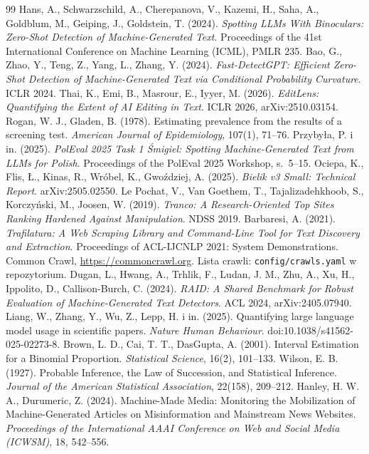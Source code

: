 \documentclass[11pt,a4paper]{article}
\begin{document}
\begin{thebibliography}{99}\small
{} Hans, A., Schwarzschild, A., Cherepanova, V., Kazemi, H., Saha, A., Goldblum, M., Geiping, J., Goldstein, T. (2024). \emph{Spotting LLMs With Binoculars: Zero-Shot Detection of Machine-Generated Text}. Proceedings of the 41st International Conference on Machine Learning (ICML), PMLR 235.
 Bao, G., Zhao, Y., Teng, Z., Yang, L., Zhang, Y. (2024). \emph{Fast-DetectGPT: Efficient Zero-Shot Detection of Machine-Generated Text via Conditional Probability Curvature}. ICLR 2024.
 Thai, K., Emi, B., Masrour, E., Iyyer, M. (2026). \emph{EditLens: Quantifying the Extent of AI Editing in Text}. ICLR 2026, arXiv:2510.03154.
 Rogan, W. J., Gladen, B. (1978). Estimating prevalence from the results of a screening test. \emph{American Journal of Epidemiology}, 107(1), 71--76.
 Przybyła, P. i in. (2025). \emph{PolEval 2025 Task 1 Śmigiel: Spotting Machine-Generated Text from LLMs for Polish}. Proceedings of the PolEval 2025 Workshop, s.~5--15.
 Ociepa, K., Flis, Ł., Kinas, R., Wróbel, K., Gwoździej, A. (2025). \emph{Bielik v3 Small: Technical Report}. arXiv:2505.02550.
 Le Pochat, V., Van Goethem, T., Tajalizadehkhoob, S., Korczyński, M., Joosen, W. (2019). \emph{Tranco: A Research-Oriented Top Sites Ranking Hardened Against Manipulation}. NDSS 2019.
 Barbaresi, A. (2021). \emph{Trafilatura: A Web Scraping Library and Command-Line Tool for Text Discovery and Extraction}. Proceedings of ACL-IJCNLP 2021: System Demonstrations.
 Common Crawl, \url{https://commoncrawl.org}. Lista crawli: \texttt{config/crawls.yaml} w repozytorium.
 Dugan, L., Hwang, A., Trhlik, F., Ludan, J. M., Zhu, A., Xu, H., Ippolito, D., Callison-Burch, C. (2024). \emph{RAID: A Shared Benchmark for Robust Evaluation of Machine-Generated Text Detectors}. ACL 2024, arXiv:2405.07940.
 Liang, W., Zhang, Y., Wu, Z., Lepp, H. i in. (2025). Quantifying large language model usage in scientific papers. \emph{Nature Human Behaviour}. doi:10.1038/s41562-025-02273-8.
 Brown, L. D., Cai, T. T., DasGupta, A. (2001). Interval Estimation for a Binomial Proportion. \emph{Statistical Science}, 16(2), 101--133.
 Wilson, E. B. (1927). Probable Inference, the Law of Succession, and Statistical Inference. \emph{Journal of the American Statistical Association}, 22(158), 209--212.
 Hanley, H. W. A., Durumeric, Z. (2024). Machine-Made Media: Monitoring the Mobilization of Machine-Generated Articles on Misinformation and Mainstream News Websites. \emph{Proceedings of the International AAAI Conference on Web and Social Media (ICWSM)}, 18, 542--556.

\end{thebibliography}
\end{document}
